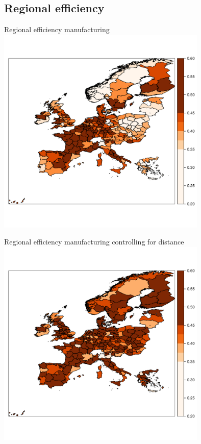 \documentclass[presentation]{beamer}
\begin{document}
\subsection{Regional efficiency}

\begin{frame}{Regional efficiency manufacturing}
\includegraphics[width=0.75\textwidth]{TEfrontier}
\end{frame}

\begin{frame}{Regional efficiency manufacturing controlling for distance}
\includegraphics[width=0.75\textwidth]{TEfrontierError}
\end{frame}
\end{document}
